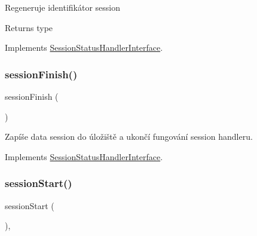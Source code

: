Regeneruje identifikátor session

\begin{DoxyReturn}{Returns}
type 
\end{DoxyReturn}


Implements \mbox{\hyperlink{interface_pes_1_1_session_1_1_session_status_handler_interface}{Session\+Status\+Handler\+Interface}}.

\mbox{\label{class_pes_1_1_session_1_1_session_status_handler_a7a2d485c1a1c3c6454a6ca583beefee6}} 
\subsubsection{\texorpdfstring{session\+Finish()}{sessionFinish()}}
{\footnotesize\ttfamily session\+Finish (\begin{DoxyParamCaption}{ }\end{DoxyParamCaption})}

Zapíše data session do úložiště a ukončí fungování session handleru. 

Implements \mbox{\hyperlink{interface_pes_1_1_session_1_1_session_status_handler_interface}{Session\+Status\+Handler\+Interface}}.

\mbox{\label{class_pes_1_1_session_1_1_session_status_handler_a3ea6a2c27100f1c8c69a245e16b107e6}} 
\subsubsection{\texorpdfstring{session\+Start()}{sessionStart()}}
{\footnotesize\ttfamily session\+Start (\begin{DoxyParamCaption}{ }\end{DoxyParamCaption})\hspace{0.3cm}{\ttfamily [final]}, {\ttfamily [protected]}}

